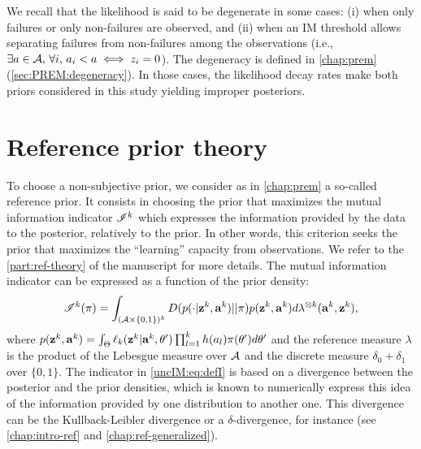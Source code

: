     We recall that the likelihood is said to be degenerate in some cases: (i) when only failures or only non-failures are observed, and (ii) when an IM threshold allows separating failures from non-failures among the observations (i.e., $\exists a\in\mathcal{A},\, \forall i,\, a_i<a\iff z_i=0$).
    The degeneracy is defined in \cref{chap:prem} (\cref{sec:PREM:degeneracy}). In those cases, the likelihood decay rates make both priors considered in this study yielding improper posteriors.
    


\section{Reference prior theory} \label{uncIM:sec:objprior}

    To choose a non-subjective prior, we consider as in \cref{chap:prem} a so-called reference prior. It consists in choosing the prior that maximizes the mutual information indicator $\mathscr{I}^k$ which expresses the information provided by the data to the posterior, relatively to the prior. In other words, this criterion seeks the prior that maximizes the ``learning'' capacity from observations. We refer to the \cref{part:ref-theory} of the manuscript for more details. The mutual information indicator can be expressed as a function of the prior density: %
    \begin{equation}
        \mathscr{I}^k(\pi) =
        \int_{(\mathcal{A}\times \{0,1\})^k} D(p(\cdot|\mathbf{z}^k,\mathbf{a}^k)||\pi)p(\mathbf{z}^k,\mathbf{a}^k)d\lambda^{\otimes k}(\mathbf{a}^k,\mathbf{z}^k),
         \label{uncIM:eq:defI}
    \end{equation}
    where $p(\mathbf{z}^k,\mathbf{a}^k) = \int_{\Theta} \ell_k(\mathbf{z}^k|\mathbf{a}^k,\theta' ) \prod_{l=1}^kh(a_l) \pi(\theta')d\theta'$ and the reference measure $\lambda$ is the product of the Lebesgue measure over $\mathcal{A}$ and the discrete measure $\delta_0+\delta_1$ over $\{0,1\}$. %
The indicator in \cref{uncIM:eq:defI} is based on a divergence between the posterior and the prior densities, which is known to numerically express this idea of the information provided by one distribution to another one.
    This divergence can be the Kullback-Leibler divergence or a $\delta$-divergence, for instance (see \cref{chap:intro-ref} and \cref{chap:ref-generalized}).


